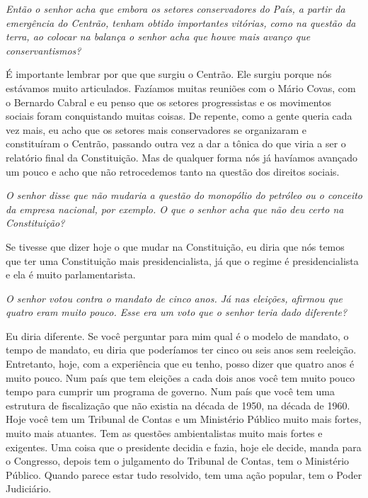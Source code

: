 \medskip

\emph{Então o senhor acha que embora os setores conservadores do País,
a partir da emergência do Centrão, tenham obtido importantes vitórias,
como na questão da terra, ao colocar na balança o senhor acha que houve
mais avanço que conservantismos?}

É importante lembrar por que que surgiu o Centrão. Ele
surgiu porque nós estávamos muito articulados. Fazíamos muitas reuniões
com o Mário Covas, com o Bernardo Cabral e eu penso que os setores
progressistas e os movimentos sociais foram conquistando muitas coisas.
De repente, como a gente queria cada vez mais, eu acho que os setores
mais conservadores se organizaram e constituíram o Centrão, passando
outra vez a dar a tônica do que viria a ser o relatório final da
Constituição. Mas de qualquer forma nós já havíamos avançado um pouco e
acho que não retrocedemos tanto na questão dos direitos sociais.

\medskip

\emph{O senhor disse que não mudaria a questão do monopólio do
petróleo ou o conceito da empresa nacional, por exemplo. O que o senhor
acha que não deu certo na Constituição?}

Se tivesse que dizer hoje o que mudar na Constituição, eu
diria que nós temos que ter uma Constituição mais presidencialista, já
que o regime é presidencialista e ela é muito parlamentarista.

\medskip

\emph{O senhor votou contra o mandato de cinco anos. Já nas eleições,
afirmou que quatro eram muito pouco. Esse era um voto que o senhor teria
dado diferente?}

Eu diria diferente. Se você perguntar para mim qual é o
modelo de mandato, o tempo de mandato, eu diria que poderíamos ter cinco
ou seis anos sem reeleição. Entretanto, hoje, com a experiência que eu
tenho, posso dizer que quatro anos é muito pouco. Num país que tem
eleições a cada dois anos você tem muito pouco tempo para cumprir um
programa de governo. Num país que você tem uma estrutura de fiscalização
que não existia na década de 1950, na década de 1960. Hoje você tem um
Tribunal de Contas e um Ministério Público muito mais fortes, muito mais
atuantes. Tem as questões ambientalistas muito mais fortes e exigentes.
Uma coisa que o presidente decidia e fazia, hoje ele decide, manda para
o Congresso, depois tem o julgamento do Tribunal de Contas, tem o
Ministério Público. Quando parece estar tudo resolvido, tem uma ação
popular, tem o Poder Judiciário.

